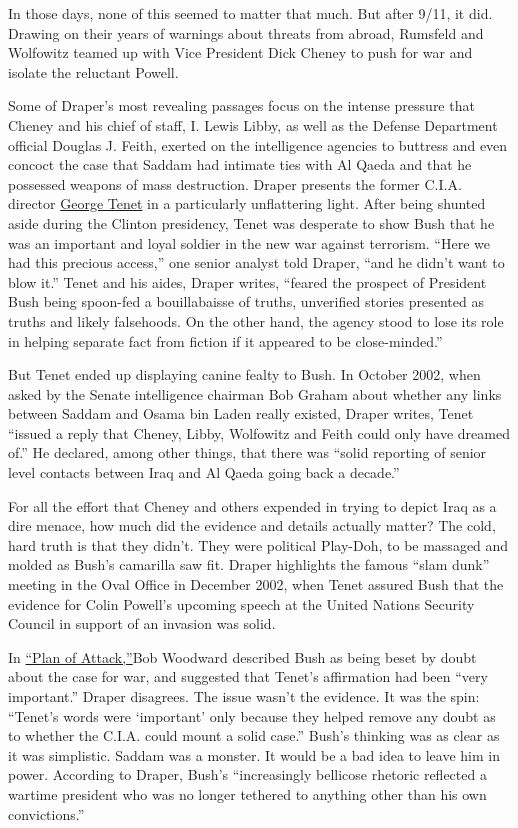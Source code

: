In those days, none of this seemed to matter that much. But after 9/11,
it did. Drawing on their years of warnings about threats from abroad,
Rumsfeld and Wolfowitz teamed up with Vice President Dick Cheney to push
for war and isolate the reluctant Powell.

Some of Draper's most revealing passages focus on the intense pressure
that Cheney and his chief of staff, I. Lewis Libby, as well as the
Defense Department official Douglas J. Feith, exerted on the
intelligence agencies to buttress and even concoct the case that Saddam
had intimate ties with Al Qaeda and that he possessed weapons of mass
destruction. Draper presents the former C.I.A. director
\href{https://www.cnn.com/2013/08/06/us/george-tenet-fast-facts/index.html}{George
Tenet} in a particularly unflattering light. After being shunted aside
during the Clinton presidency, Tenet was desperate to show Bush that he
was an important and loyal soldier in the new war against terrorism.
``Here we had this precious access,'' one senior analyst told Draper,
``and he didn't want to blow it.'' Tenet and his aides, Draper writes,
``feared the prospect of President Bush being spoon-fed a bouillabaisse
of truths, unverified stories presented as truths and likely falsehoods.
On the other hand, the agency stood to lose its role in helping separate
fact from fiction if it appeared to be close-minded.''

But Tenet ended up displaying canine fealty to Bush. In October 2002,
when asked by the Senate intelligence chairman Bob Graham about whether
any links between Saddam and Osama bin Laden really existed, Draper
writes, Tenet ``issued a reply that Cheney, Libby, Wolfowitz and Feith
could only have dreamed of.'' He declared, among other things, that
there was ``solid reporting of senior level contacts between Iraq and Al
Qaeda going back a decade.''

For all the effort that Cheney and others expended in trying to depict
Iraq as a dire menace, how much did the evidence and details actually
matter? The cold, hard truth is that they didn't. They were political
Play-Doh, to be massaged and molded as Bush's camarilla saw fit. Draper
highlights the famous ``slam dunk'' meeting in the Oval Office in
December 2002, when Tenet assured Bush that the evidence for Colin
Powell's upcoming speech at the United Nations Security Council in
support of an invasion was solid.

In
\href{https://www.nytimes3xbfgragh.onion/2004/04/28/books/review/plan-of-attack-all-the-presidents-mentors.html}{``Plan
of Attack,''}Bob Woodward described Bush as being beset by doubt about
the case for war, and suggested that Tenet's affirmation had been ``very
important.'' Draper disagrees. The issue wasn't the evidence. It was the
spin: ``Tenet's words were `important' only because they helped remove
any doubt as to whether the C.I.A. could mount a solid case.'' Bush's
thinking was as clear as it was simplistic. Saddam was a monster. It
would be a bad idea to leave him in power. According to Draper, Bush's
``increasingly bellicose rhetoric reflected a wartime president who was
no longer tethered to anything other than his own convictions.''

